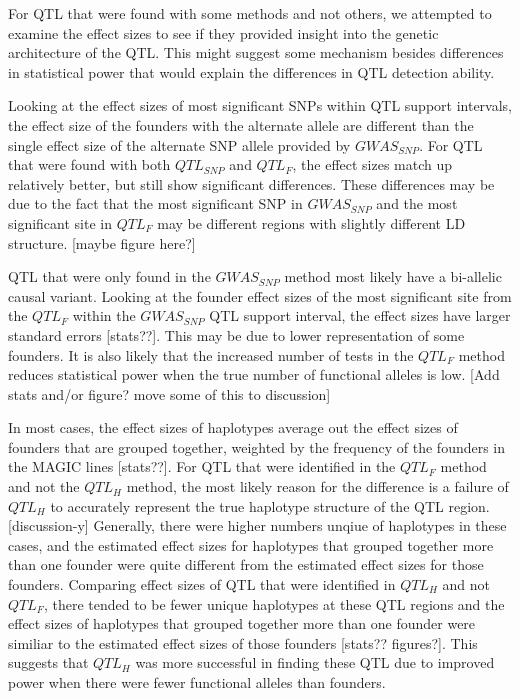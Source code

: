 \documentclass[article,9pt,twocolumn,twoside]{rilabRxiv}
\begin{document}
For QTL that were found with some methods and not others, we attempted to examine the effect sizes to see if they provided insight into the genetic architecture of the QTL.
This might suggest some mechanism besides differences in statistical power that would explain the differences in QTL detection ability.

Looking at the effect sizes of most significant SNPs within QTL support intervals, the effect size of the founders with the alternate allele are different than the single effect size of the alternate SNP allele provided by $GWAS_{SNP}$.
For QTL that were found with both $QTL_{SNP}$ and $QTL_F$, the effect sizes match up relatively better, but still show significant differences.
These differences may be due to the fact that the most significant SNP in $GWAS_{SNP}$ and the most significant site in $QTL_F$ may be different regions with slightly different LD structure.
[maybe figure here?]

QTL that were only found in the $GWAS_{SNP}$ method most likely have a bi-allelic causal variant.
Looking at the founder effect sizes of the most significant site from the $QTL_F$ within the $GWAS_{SNP}$ QTL support interval, the effect sizes have larger standard errors [stats??].
This may be due to lower representation of some founders.
It is also likely that the increased number of tests in the $QTL_F$ method reduces statistical power when the true number of functional alleles is low.
[Add stats and/or figure? move some of this to discussion]

In most cases, the effect sizes of haplotypes average out the effect sizes of founders that are grouped together, weighted by the frequency of the founders in the MAGIC lines [stats??].
For QTL that were identified in the $QTL_F$ method and not the $QTL_H$ method, the most likely reason for the difference is a failure of $QTL_H$ to accurately represent the true haplotype structure of the QTL region. [discussion-y]
Generally, there were higher numbers unqiue of haplotypes in these cases, and the estimated effect sizes for haplotypes that grouped together more than one founder were quite different from the estimated effect sizes for those founders.
Comparing effect sizes of QTL that were identified in $QTL_H$ and not $QTL_F$, there tended to be fewer unique haplotypes at these QTL regions and the effect sizes of haplotypes that grouped together more than one founder were similiar to the estimated effect sizes of those founders [stats?? figures?].
This suggests that $QTL_H$ was more successful in finding these QTL due to improved power when there were fewer functional alleles than founders.
\end{document}

